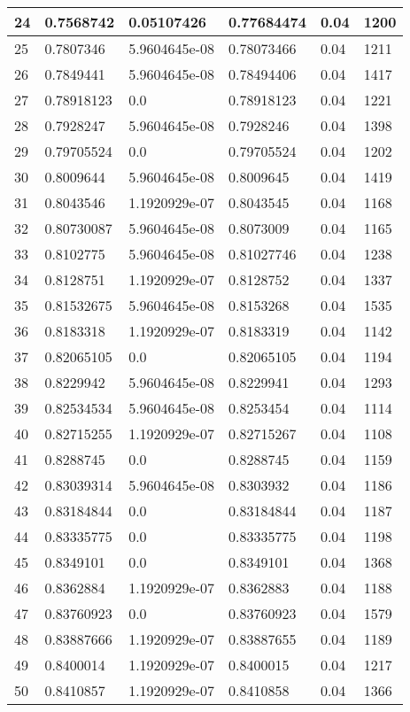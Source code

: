 \begin{longtable}{|l|l|l|l|l|l|}
24 & 0.7568742 & 0.05107426 & 0.77684474 & 0.04 & 1200 \\ \hline 
25 & 0.7807346 & 5.9604645e-08 & 0.78073466 & 0.04 & 1211 \\ \hline 
26 & 0.7849441 & 5.9604645e-08 & 0.78494406 & 0.04 & 1417 \\ \hline 
27 & 0.78918123 & 0.0 & 0.78918123 & 0.04 & 1221 \\ \hline 
28 & 0.7928247 & 5.9604645e-08 & 0.7928246 & 0.04 & 1398 \\ \hline 
29 & 0.79705524 & 0.0 & 0.79705524 & 0.04 & 1202 \\ \hline 
30 & 0.8009644 & 5.9604645e-08 & 0.8009645 & 0.04 & 1419 \\ \hline 
31 & 0.8043546 & 1.1920929e-07 & 0.8043545 & 0.04 & 1168 \\ \hline 
32 & 0.80730087 & 5.9604645e-08 & 0.8073009 & 0.04 & 1165 \\ \hline 
33 & 0.8102775 & 5.9604645e-08 & 0.81027746 & 0.04 & 1238 \\ \hline 
34 & 0.8128751 & 1.1920929e-07 & 0.8128752 & 0.04 & 1337 \\ \hline 
35 & 0.81532675 & 5.9604645e-08 & 0.8153268 & 0.04 & 1535 \\ \hline 
36 & 0.8183318 & 1.1920929e-07 & 0.8183319 & 0.04 & 1142 \\ \hline 
37 & 0.82065105 & 0.0 & 0.82065105 & 0.04 & 1194 \\ \hline 
38 & 0.8229942 & 5.9604645e-08 & 0.8229941 & 0.04 & 1293 \\ \hline 
39 & 0.82534534 & 5.9604645e-08 & 0.8253454 & 0.04 & 1114 \\ \hline 
40 & 0.82715255 & 1.1920929e-07 & 0.82715267 & 0.04 & 1108 \\ \hline 
41 & 0.8288745 & 0.0 & 0.8288745 & 0.04 & 1159 \\ \hline 
42 & 0.83039314 & 5.9604645e-08 & 0.8303932 & 0.04 & 1186 \\ \hline 
43 & 0.83184844 & 0.0 & 0.83184844 & 0.04 & 1187 \\ \hline 
44 & 0.83335775 & 0.0 & 0.83335775 & 0.04 & 1198 \\ \hline 
45 & 0.8349101 & 0.0 & 0.8349101 & 0.04 & 1368 \\ \hline 
46 & 0.8362884 & 1.1920929e-07 & 0.8362883 & 0.04 & 1188 \\ \hline 
47 & 0.83760923 & 0.0 & 0.83760923 & 0.04 & 1579 \\ \hline 
48 & 0.83887666 & 1.1920929e-07 & 0.83887655 & 0.04 & 1189 \\ \hline 
49 & 0.8400014 & 1.1920929e-07 & 0.8400015 & 0.04 & 1217 \\ \hline 
50 & 0.8410857 & 1.1920929e-07 & 0.8410858 & 0.04 & 1366 \\ \hline 
\end{longtable}